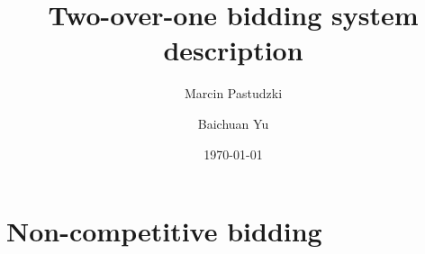 \documentclass[12pt,a4paper,twoside]{article}
\title{Two-over-one bidding system description}
\author{Marcin Pastudzki \and Baichuan Yu}
\date{\today}
\begin{document}
\maketitle
\tableofcontents
\pagebreak

\section{Non-competitive bidding}


\end{document}
